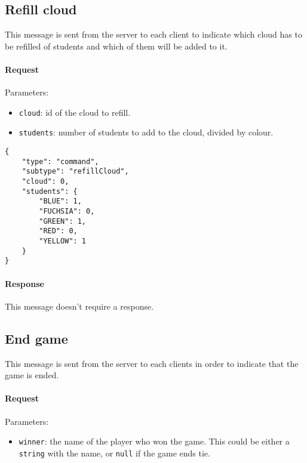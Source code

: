 \documentclass[a4paper]{article}
\begin{document}
	\pagebreak

	\subsection{Refill cloud}

	This message is sent from the server to each client to indicate which cloud has to be refilled of students and which of them will be added to it.

	\paragraph{Request} Parameters:

	\begin{itemize}
		\item \verb|cloud|: id of the cloud to refill.
		\item \verb|students|: number of students to add to the cloud, divided by colour.
	\end{itemize}

	\begin{verbatim}
{
	"type": "command",
	"subtype": "refillCloud",
	"cloud": 0,
	"students": {
		"BLUE": 1,
		"FUCHSIA": 0,
		"GREEN": 1,
		"RED": 0,
		"YELLOW": 1
	}
}
	\end{verbatim}

	\paragraph{Response} This message doesn't require a response.

	\subsection{End game}

	This message is sent from the server to each clients in order to indicate that the game is ended.

	\paragraph{Request} Parameters:

	\begin{itemize}
		\item \verb|winner|: the name of the player who won the game. This could be either a \verb|string| with the name, or \texttt{null} if the game ends tie.
	\end{itemize}
\end{document}
